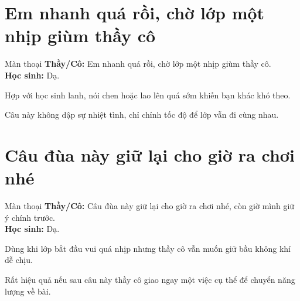 \section{Em nhanh quá rồi, chờ lớp một nhịp giùm thầy cô}
\begin{manthoai}{Màn thoại}
\textbf{Thầy/Cô:} Em nhanh quá rồi, chờ lớp một nhịp giùm thầy cô.\\
\textbf{Học sinh:} Dạ.
\end{manthoai}
\begin{dungkhinào}
Hợp với học sinh lanh, nói chen hoặc lao lên quá sớm khiến bạn khác khó theo.
\end{dungkhinào}
\begin{nhipthem}
Câu này không dập sự nhiệt tình, chỉ chỉnh tốc độ để lớp vẫn đi cùng nhau.
\end{nhipthem}
\ngancach

\section{Câu đùa này giữ lại cho giờ ra chơi nhé}
\begin{manthoai}{Màn thoại}
\textbf{Thầy/Cô:} Câu đùa này giữ lại cho giờ ra chơi nhé, còn giờ mình giữ ý chính trước.\\
\textbf{Học sinh:} Dạ.
\end{manthoai}
\begin{dungkhinào}
Dùng khi lớp bắt đầu vui quá nhịp nhưng thầy cô vẫn muốn giữ bầu không khí dễ chịu.
\end{dungkhinào}
\begin{nhipthem}
Rất hiệu quả nếu sau câu này thầy cô giao ngay một việc cụ thể để chuyển năng lượng về bài.
\end{nhipthem}
